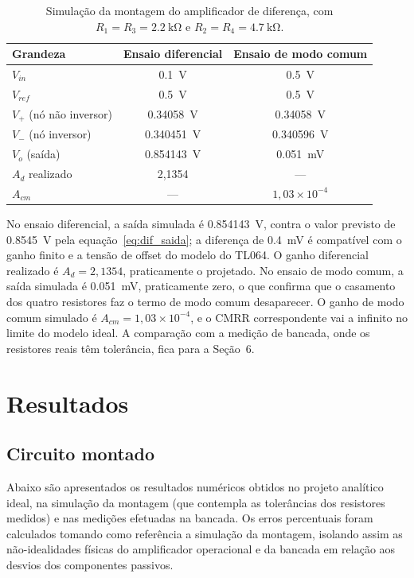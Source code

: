 \documentclass[11pt,a4paper]{article}
\begin{document}
\begin{table}[h]
\centering
\caption{Simulação da montagem do amplificador de diferença, com $R_1 = R_3 = \SI{2,2}{\kilo\ohm}$ e $R_2 = R_4 = \SI{4,7}{\kilo\ohm}$.}
\label{tab:dif_sim_bancada}
\begin{tabular}{lcc}
\hline
Grandeza & Ensaio diferencial & Ensaio de modo comum \\
\hline
$V_{in}$ & \SI{0,1}{\volt} & \SI{0,5}{\volt} \\
$V_{ref}$ & \SI{0,5}{\volt} & \SI{0,5}{\volt} \\
$V_+$ (nó não inversor) & \SI{0,34058}{\volt} & \SI{0,34058}{\volt} \\
$V_-$ (nó inversor) & \SI{0,340451}{\volt} & \SI{0,340596}{\volt} \\
$V_o$ (saída) & \SI{0,854143}{\volt} & \SI{0,051}{\milli\volt} \\
$A_d$ realizado & 2,1354 & --- \\
$A_{cm}$ & --- & $1{,}03 \times 10^{-4}$ \\
\hline
\end{tabular}
\end{table}

No ensaio diferencial, a saída simulada é \SI{0,854143}{\volt}, contra o valor previsto de \SI{0,8545}{\volt} pela equação~\eqref{eq:dif_saida}; a diferença de \SI{0,4}{\milli\volt} é compatível com o ganho finito e a tensão de offset do modelo do TL064. O ganho diferencial realizado é $A_d = 2{,}1354$, praticamente o projetado. No ensaio de modo comum, a saída simulada é \SI{0,051}{\milli\volt}, praticamente zero, o que confirma que o casamento dos quatro resistores faz o termo de modo comum desaparecer. O ganho de modo comum simulado é $A_{cm} = 1{,}03 \times 10^{-4}$, e o CMRR correspondente vai a infinito no limite do modelo ideal. A comparação com a medição de bancada, onde os resistores reais têm tolerância, fica para a Seção~6.

\section{Resultados}

\subsection{Circuito montado}

Abaixo são apresentados os resultados numéricos obtidos no projeto analítico ideal, na simulação da montagem (que contempla as tolerâncias dos resistores medidos) e nas medições efetuadas na bancada. Os erros percentuais foram calculados tomando como referência a simulação da montagem, isolando assim as não-idealidades físicas do amplificador operacional e da bancada em relação aos desvios dos componentes passivos.
\end{document}

